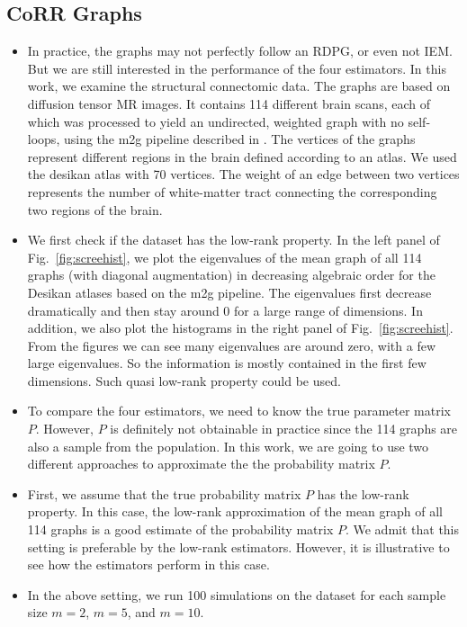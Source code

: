 \documentclass[a4paper]{article}
\begin{document}
\subsection{CoRR Graphs}
\begin{itemize}
\item In practice, the graphs may not perfectly follow an RDPG, or even not IEM. But we are still interested in the performance of the four estimators. In this work, we examine the structural connectomic data. The graphs are based on diffusion tensor MR
images. It contains 114 different brain scans, each of which was processed to yield an undirected, weighted graph with no
self-loops, using the m2g pipeline described in \citet{kiar2016ndmg}. The vertices of the graphs represent different regions in the brain defined according to an atlas. We used the desikan atlas with 70 vertices. The weight of an edge between two vertices represents the number of white-matter tract connecting the corresponding two regions of the brain.
\item We first check if the dataset has the low-rank property. In the left panel of Fig.~\ref{fig:screehist}, we plot the eigenvalues of the mean graph of all 114 graphs (with diagonal augmentation) in decreasing algebraic order for the Desikan atlases based on the m2g pipeline. The eigenvalues first decrease dramatically and then stay around 0 for a large range of dimensions. In addition, we also plot the histograms in the right panel of Fig.~\ref{fig:screehist}. From the figures we can see many eigenvalues are around zero, with a few large eigenvalues. So the information is mostly contained in the first few dimensions. Such quasi low-rank property could be used.
\item To compare the four estimators, we need to know the true parameter matrix $P$. However, $P$ is definitely not obtainable in practice since the 114 graphs are also a sample from the population. In this work, we are going to use two different approaches to approximate the the probability matrix $P$.
\item First, we assume that the true probability matrix $P$ has the low-rank property. In this case, the low-rank approximation of the mean graph of all 114 graphs is a good estimate of the probability matrix $P$.
We admit that this setting is preferable by the low-rank estimators. However, it is illustrative to see how the estimators perform in this case.
\item In the above setting, we run 100 simulations on the dataset for each sample size $m = 2$, $m = 5$, and $m = 10$.

\end{itemize}
\end{document}
